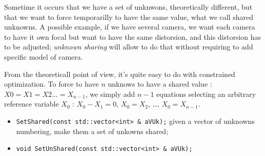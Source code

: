 Sometime it occurs  that we have a set of unknwons, theoretically different, but that we want to force
temporarilly to have the same value, what we call shared unknowns. A possible example, if we have several
camera, we want each camera to have it own focal but want to have the same distorsion, and this distorsion
has to be adjusted;  \emph{unknown sharing} will allow to do that without requiring to add specific model of camera.

From the theoreticall point of view, it's quite easy to do with constrained optimization.  To force to
have $n$ unknows to have a shared value : $X0=X1=X2\dots=X_{n-1}$, we simply add $n-1$ equations selecting
an arbitrary reference variable $X_0$ : $X_0-X_1=0$, $X_0=X_2$, \dots , $X_0=X_{n-1}$.

\begin{itemize}
    \item   {\tt SetShared(const std::vector<int> \&  aVUk);}  given a vector of unknowns numbering,
            make them a set of unkowns  shared;
    \item   {\tt    void   SetUnShared(const std::vector<int> \&  aVUk);}
\end{itemize}







